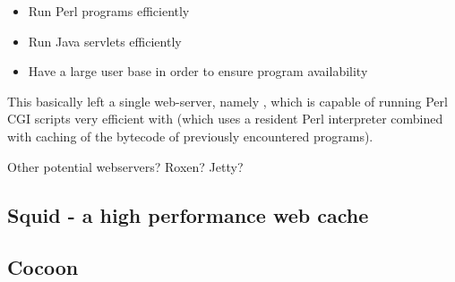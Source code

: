 \begin{itemize}
\item Run Perl programs efficiently
\item Run Java servlets efficiently
\item Have a large user base in order to ensure program availability
\end{itemize}

This basically left a single web-server, namely
, which is capable of running
Perl CGI scripts very efficient with
 (which
uses a resident Perl interpreter combined with caching of the bytecode
of previously encountered programs).

\textsf{Other potential webservers?  Roxen?  Jetty?}


\subsection{Squid - a high performance web cache}
\label{sec:squid}



\subsection{Cocoon}
\label{sec:cocoon}




